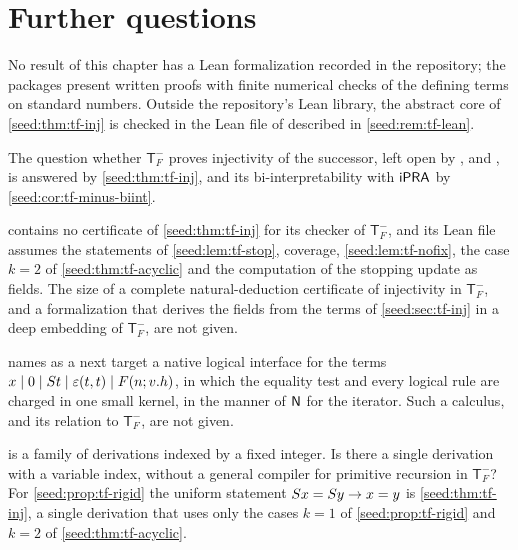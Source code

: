 \section{Further questions}
\label{seed:sec:questions}

No result of this chapter has a Lean formalization recorded in the
repository; the packages present written proofs with finite numerical
checks of the defining terms on standard numbers. Outside the repository's
Lean library, the abstract core of \cref{seed:thm:tf-inj} is checked in the
Lean file of  described in \cref{seed:rem:tf-lean}.

The question whether $\mathsf{T}_F^{-}$ proves injectivity of the successor,
left open by ,  and
, is answered by \cref{seed:thm:tf-inj}, and its
bi-interpretability with $\mathsf{iPRA}$ by \cref{seed:cor:tf-minus-biint}.

\begin{question}
 contains no certificate of \cref{seed:thm:tf-inj}
for its checker of $\mathsf{T}_F^{-}$, and its Lean file assumes the
statements of \cref{seed:lem:tf-stop}, coverage, \cref{seed:lem:tf-nofix},
the case $k=2$ of \cref{seed:thm:tf-acyclic} and the computation of the
stopping update as fields. The size of a complete natural-deduction
certificate of injectivity in $\mathsf{T}_F^{-}$, and a formalization that
derives the fields from the terms of \cref{seed:sec:tf-inj} in a deep
embedding of $\mathsf{T}_F^{-}$, are not given.
\end{question}

\begin{question}
 names as a next target a native logical interface
for the terms $x\mid0\mid S t\mid\varepsilon(t,t)\mid F(n;v.h)$, in which
the equality test and every logical rule are charged in one small kernel, in
the manner of $\mathsf{N}$ for the iterator. Such a calculus, and its relation to
$\mathsf{T}_F^{-}$, are not given.
\end{question}

\begin{question}
 is a family of derivations indexed by a fixed
integer. Is there a single derivation with a variable index, without a
general compiler for primitive recursion in $\mathsf{T}_F^{-}$? For
\cref{seed:prop:tf-rigid} the uniform statement $S x=S y\to x=y$ is
\cref{seed:thm:tf-inj}, a single derivation that uses only the cases $k=1$ of
\cref{seed:prop:tf-rigid} and $k=2$ of \cref{seed:thm:tf-acyclic}.
\end{question}

